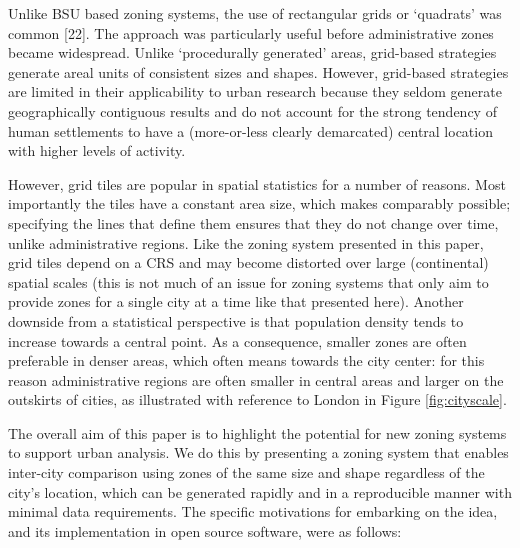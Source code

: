 \documentclass{josis}
\begin{document}
Unlike BSU based zoning systems, the use of rectangular grids or `quadrats' was common {[}22{]}.
The approach was particularly useful before administrative zones became widespread.
Unlike `procedurally generated' areas, grid-based strategies generate areal units of consistent sizes and shapes.
However, grid-based strategies are limited in their applicability to urban research because they seldom generate geographically contiguous results and do not account for the strong tendency of human settlements to have a (more-or-less clearly demarcated) central location with higher levels of activity.

However, grid tiles are popular in spatial statistics for a number of reasons.
Most importantly the tiles have a constant area size, which makes comparably possible; specifying the lines that define them ensures that they do not change over time, unlike administrative regions.
Like the zoning system presented in this paper, grid tiles depend on a CRS and may become distorted over large (continental) spatial scales (this is not much of an issue for zoning systems that only aim to provide zones for a single city at a time like that presented here).
Another downside from a statistical perspective is that population density tends to increase towards a central point.
As a consequence, smaller zones are often preferable in denser areas, which often means towards the city center: for this reason administrative regions are often smaller in central areas and larger on the outskirts of cities, as illustrated with reference to London in Figure \ref{fig:cityscale}.

The overall aim of this paper is to highlight the potential for new zoning systems to support urban analysis.
We do this by presenting a zoning system that enables inter-city comparison using zones of the same size and shape regardless of the city's location, which can be generated rapidly and in a reproducible manner with minimal data requirements.
The specific motivations for embarking on the idea, and its implementation in open source software, were as follows:
\end{document}
